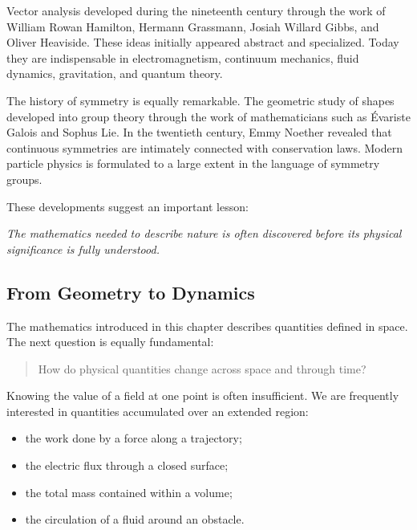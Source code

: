 Vector analysis developed during the nineteenth century through the work of
William Rowan Hamilton, Hermann Grassmann, Josiah Willard Gibbs, and Oliver
Heaviside. These ideas initially appeared abstract and specialized. Today they
are indispensable in electromagnetism, continuum mechanics, fluid dynamics,
gravitation, and quantum theory.

The history of symmetry is equally remarkable. The geometric study of shapes
developed into group theory through the work of mathematicians such as
Évariste Galois and Sophus Lie. In the twentieth century, Emmy Noether revealed
that continuous symmetries are intimately connected with conservation laws.
Modern particle physics is formulated to a large extent in the language of
symmetry groups.

These developments suggest an important lesson:

\begin{center}
\begin{minipage}{0.82\textwidth}
\centering
\emph{The mathematics needed to describe nature is often discovered before
its physical significance is fully understood.}
\end{minipage}
\end{center}

\subsection{From Geometry to Dynamics}

The mathematics introduced in this chapter describes quantities defined in
space. The next question is equally fundamental:

\begin{quote}
How do physical quantities change across space and through time?
\end{quote}

Knowing the value of a field at one point is often insufficient. We are
frequently interested in quantities accumulated over an extended region:

\begin{itemize}
\item the work done by a force along a trajectory;
\item the electric flux through a closed surface;
\item the total mass contained within a volume;
\item the circulation of a fluid around an obstacle.
\end{itemize}

